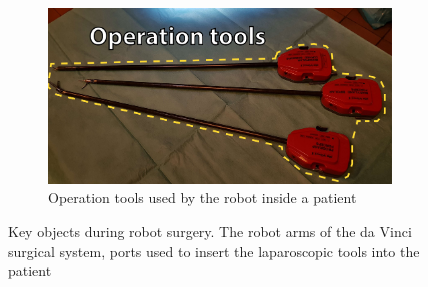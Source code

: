 \documentclass[conference]{IEEEtran}
\begin{document}
\begin{figure}[H]
	\begin{subfigure}[b]{0.48\textwidth}
		\includegraphics[width=\textwidth]{Figures/tools.pdf}
		\caption{Operation tools used by the robot inside a patient}
		\label{fig:tools}
	\end{subfigure}
	\caption{Key objects during robot surgery. The robot arms of the da Vinci surgical system, ports used to insert the laparoscopic tools into the patient}
	\label{Fig:fieldresult}
\end{figure}
\end{document}
